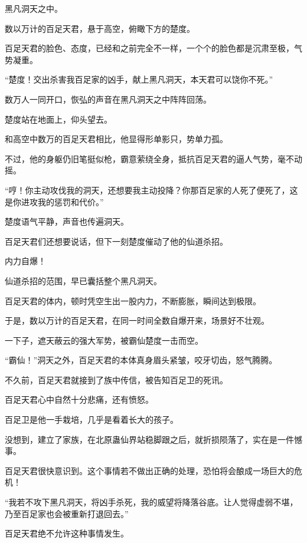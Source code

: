 
\begin{this_body}



黑凡洞天之中。

数以万计的百足天君，悬于高空，俯瞰下方的楚度。

百足天君的脸色、态度，已经和之前完全不一样，一个个的脸色都是沉肃至极，气势凝重。

“楚度！交出杀害我百足家的凶手，献上黑凡洞天，本天君可以饶你不死。”

数万人一同开口，恢弘的声音在黑凡洞天之中阵阵回荡。

楚度站在地面上，仰头望去。

和高空中数万的百足天君相比，他显得形单影只，势单力孤。

不过，他的身躯仍旧笔挺似枪，霸意萦绕全身，抵抗百足天君的逼人气势，毫不动摇。

“哼！你主动攻伐我的洞天，还想要我主动投降？你那百足家的人死了便死了，这是你进攻我的惩罚和代价。”

楚度语气平静，声音也传遍洞天。

百足天君们还想要说话，但下一刻楚度催动了他的仙道杀招。

内力自爆！

仙道杀招的范围，早已囊括整个黑凡洞天。

百足天君的体内，顿时凭空生出一股内力，不断膨胀，瞬间达到极限。

于是，数以万计的百足天君，在同一时间全数自爆开来，场景好不壮观。

一下子，遮天蔽云的强大军势，被霸仙楚度一击而空。

“霸仙！”洞天之外，百足天君的本体真身眉头紧皱，咬牙切齿，怒气腾腾。

不久前，百足天君就接到了族中传信，被告知百足卫的死讯。

百足天君心中自然十分悲痛，还有愤怒。

百足卫是他一手栽培，几乎是看着长大的孩子。

没想到，建立了家族，在北原蛊仙界站稳脚跟之后，就折损陨落了，实在是一件憾事。

百足天君很快意识到。这个事情若不做出正确的处理，恐怕将会酿成一场巨大的危机！

“我若不攻下黑凡洞天，将凶手杀死，我的威望将降落谷底。让人觉得虚弱不堪，乃至百足家也会被重新打退回去。”

百足天君绝不允许这种事情发生。


\end{this_body}
